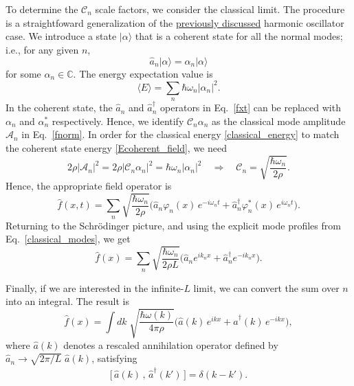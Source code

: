 \documentclass[pra,12pt]{revtex4-2}
\begin{document}
To determine the $\mathcal{C}_n$ scale factors, we consider the
classical limit.  The procedure is a straightfoward generalization of
the \hyperref[sec:ho]{previously discussed} harmonic oscillator case.
We introduce a state $|\alpha\rangle$ that is a coherent state for all
the normal modes; i.e., for any given $n$,
\begin{equation}
  \hat{a}_n |\alpha\rangle = \alpha_n |\alpha\rangle
\end{equation}
for some $\alpha_n \in \mathbb{C}$.  The energy expectation value is
\begin{equation}
  \langle E\rangle = \sum_n \hbar \omega_n |\alpha_n|^2.
  \label{Ecoherent_field}
\end{equation}
In the coherent state, the $\hat{a}_n$ and $\hat{a}_n^\dagger$
operators in Eq.~\eqref{fxt} can be replaced with $\alpha_n$ and
$\alpha_n^*$ respectively.  Hence, we identify $\mathcal{C}_n
\alpha_n$ as the classical mode amplitude $\mathcal{A}_n$ in
Eq.~\eqref{fnorm}.  In order for the classical energy
\eqref{classical_energy} to match the coherent state energy
\eqref{Ecoherent_field}, we need
\begin{equation}
  2\rho |\mathcal{A}_n|^2 = 2 \rho |\mathcal{C}_n\alpha_n|^2
  = \hbar \omega_n |\alpha_n|^2 \quad \Rightarrow \quad
  \mathcal{C}_n = \sqrt{\frac{\hbar\omega_n}{2\rho}}.
\end{equation}
Hence, the appropriate field operator is
\begin{equation}
  \hat{f}(x,t) = \sum_n \sqrt{\frac{\hbar\omega_n}{2\rho}}
  \Big(\hat{a}_n \varphi_n(x) \,e^{-i\omega_nt}
  + \hat{a}_n^\dagger \varphi_n^*(x) \, e^{i\omega_nt} \Big).
\end{equation}
Returning to the Schr\"odinger picture, and using the explicit mode
profiles from Eq.~\eqref{classical_modes}, we get
\begin{equation}
  \hat{f}(x) = \sum_n \sqrt{\frac{\hbar\omega_n}{2\rho L}}
  \Big(\hat{a}_n e^{ik_n x}
  + \hat{a}_n^\dagger e^{-ik_n x} \Big).
\end{equation}

Finally, if we are interested in the infinite-$L$ limit, we can
convert the sum over $n$ into an integral.
The result is
\begin{equation}
  \hat{f}(x) = \int dk\; \sqrt{\frac{\hbar\omega(k)}{4\pi\rho}}
  \Big(\hat{a}(k)\, e^{ik x} + \hat{a}^\dagger(k)\, e^{-ik x} \Big),
\end{equation}
where $\hat{a}(k)$ denotes a rescaled annihilation operator defined by
$\hat{a}_n \rightarrow \sqrt{2\pi/L}\; \hat{a}(k)$, satisfying
\begin{align}
  \Big[\,\hat{a}(k)\,,\, \hat{a}^\dagger(k')\,\Big] = \delta(k-k').
\end{align}
\end{document}
